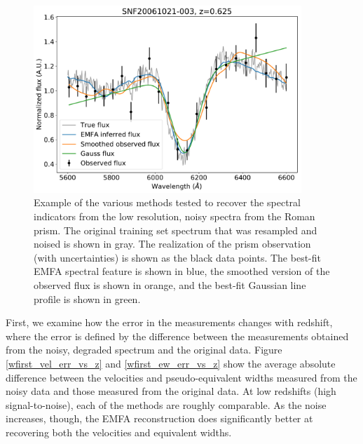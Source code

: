 \begin{figure}[htbp]
    \centering
    \includegraphics[width=0.9\textwidth]{figures/si_feat_pca/example_wfirst_emfa_recovery.pdf}
    \caption{Example of the various methods tested to recover the spectral indicators from the low resolution, noisy spectra from the Roman prism. The original training set spectrum that was resampled and noised is shown in gray. The realization of the prism observation (with uncertainties) is shown as the black data points. The best-fit EMFA spectral feature is shown in blue, the smoothed version of the observed flux is shown in orange, and the best-fit Gaussian line profile is shown in green.}
    \label{example_wfirst_recovery}
\end{figure}

First, we examine how the error in the measurements changes with redshift, where the error is defined by the difference between the measurements obtained from the noisy, degraded spectrum and the original data. Figure \ref{wfirst_vel_err_vs_z} and \ref{wfirst_ew_err_vs_z} show the average absolute difference between the velocities and pseudo-equivalent widths measured from the noisy data and those measured from the original data. At low redshifts (high signal-to-noise), each of the methods are roughly comparable. As the noise increases, though, the EMFA reconstruction does significantly better at recovering both the velocities and equivalent widths.

